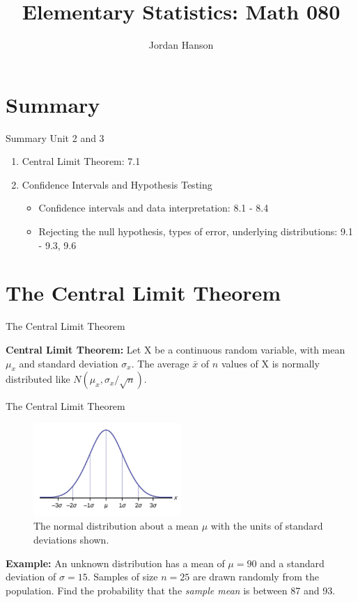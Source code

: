 \documentclass{beamer}
\title{Elementary Statistics: Math 080}
\author{Jordan Hanson}
\institute{Whittier College Department of Physics and Astronomy}
\begin{document}
\maketitle

\section{Summary}

\begin{frame}{Summary}
Unit 2 and 3
\begin{enumerate}
\item Central Limit Theorem: 7.1
\item Confidence Intervals and Hypothesis Testing
\begin{itemize}
\item Confidence intervals and data interpretation: 8.1 - 8.4
\item Rejecting the null hypothesis, types of error, underlying distributions: 9.1 - 9.3, 9.6
\end{itemize}
\end{enumerate}
\end{frame}

\section{The Central Limit Theorem}

\begin{frame}{The Central Limit Theorem}
\begin{tcolorbox}[colback=orange!10,colframe=orange!100,title=The Central Limit Theorem]
\textbf{Central Limit Theorem:} Let X be a continuous random variable, with mean $\mu_x$ and standard deviation $\sigma_x$.  The average $\bar{x}$ of $n$ values of X is normally distributed like $N(\mu_x,\sigma_x/\sqrt{n})$.
\end{tcolorbox}
\end{frame}

\begin{frame}{The Central Limit Theorem}
\begin{figure}
\centering
\includegraphics[width=0.5\textwidth]{figures/norm.png}
\caption{\label{fig:norm} The normal distribution about a mean $\mu$ with the units of standard deviations shown.}
\end{figure}
\textbf{Example:} An unknown distribution has a mean of $\mu = 90$ and a standard deviation of $\sigma = 15$. Samples of size $n = 25$ are drawn randomly from the population.  Find the probability that the \textit{sample mean} is between 87 and 93. \\ \vspace{1cm}
\end{frame}
\end{document}
